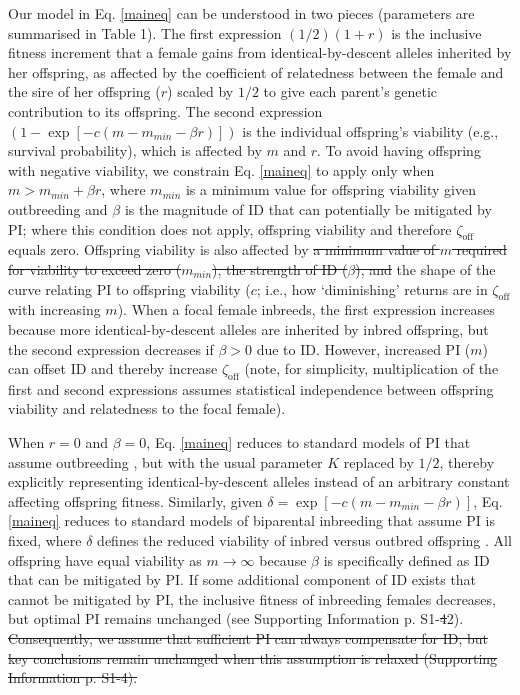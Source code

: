 \documentclass[12pt]{article}
\begin{document}
Our model in Eq. \ref{maineq} can be understood in two pieces (parameters are summarised in Table 1). The first expression $\left(1/2\right) \left(1 + r\right)$ is the inclusive fitness increment that a female gains from identical-by-descent alleles inherited by her offspring, as affected by the coefficient of relatedness between the female and the sire of her offspring ($r$) scaled by $1/2$ to give each parent's genetic contribution to its offspring. The second expression $\left(1 - \exp\left[-c\left(m-m_{min}-\beta r\right)\right]\right)$ is the individual offspring's viability {\color{blue}(e.g., survival probability)}, which is affected by $m$ and $r$. {\color{blue}To avoid having offspring with negative viability, we constrain Eq. \ref{maineq} to apply only when $m > m_{min} + \beta r$, where $m_{min}$ is a minimum value for offspring viability given outbreeding and $\beta$ is the magnitude of ID that can potentially be mitigated by PI; where this condition does not apply, offspring viability and therefore $\zeta_{\textrm{off}}$ equals zero.} Offspring viability is also affected by {\color{red}\st{a minimum value of $m$ required for viability to exceed zero ($m_{min}$), the strength of ID ($\beta$), and}} the shape of the curve relating PI to offspring viability ($c$; i.e., how `diminishing' returns are in $\zeta_{\textrm{off}}$ with increasing $m$). When a focal female inbreeds, the first expression increases because more identical-by-descent alleles are inherited by inbred offspring, but the second expression decreases if $\beta>0$ due to ID. However, increased PI ($m$) can offset ID and thereby increase $\zeta_{\textrm{off}}$ {\color{blue}(note, for simplicity, multiplication of the first and second expressions assumes statistical independence between offspring viability and relatedness to the focal female)}.

When $r=0$ and $\beta=0$, Eq. \ref{maineq} reduces to standard models of PI that assume outbreeding \cite[e.g.,][]{Macnair1978, Parker1978}, but with the usual parameter $K$ replaced by $1/2$, thereby explicitly representing identical-by-descent alleles instead of an arbitrary constant affecting offspring fitness. Similarly, given $\delta = \exp\left[-c\left(m-m_{min}-\beta r\right)\right]$, Eq. \ref{maineq} reduces to standard models of biparental inbreeding that assume PI is fixed, where $\delta$ defines the reduced viability of inbred versus outbred offspring \cite[see][]{Kokko2006, Parker2006, Duthie2015a}.  All offspring have equal viability as $m \to \infty$ {\color{blue}because $\beta$ is specifically defined as ID that can be mitigated by PI. If some additional component of ID exists that cannot be mitigated by PI, the inclusive fitness of inbreeding females decreases, but optimal PI remains unchanged (see Supporting Information p. S1-{\color{red}\st{4}}{\color{blue}2}).}{\color{red}\st{ Consequently, we assume that sufficient PI can always compensate for ID, but key conclusions remain unchanged when this assumption is relaxed (Supporting Information p. S1-4).}}
\end{document}
